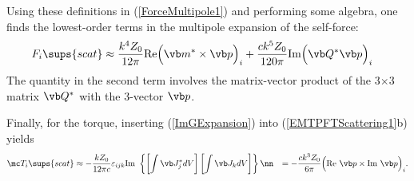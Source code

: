 Using these definitions in (\ref{ForceMultipole1}) and performing
some algebra, one finds the lowest-order terms in the multipole 
expansion of the self-force:
\begin{align}
  F_i\sups{scat}
\label{ForceMultipole1}
&\approx
\frac{k^4 Z_0}{12\pi}\text{Re}\Big( \vb m^* \times \vb p \Big)_i
+
\frac{c k^5 Z_0}{120\pi}\text{Im}\Big( \vb Q^* \vb p \Big)_i
\end{align}
The quantity in the second term involves the matrix-vector product 
of the 3$\times $3 matrix $\vb Q^*$ with the 3-vector $\vb p$.

Finally, for the torque, inserting (\ref{ImGExpansion}) into
(\ref{EMTPFTScattering1}b) yields
\begin{align}
  \mc T_i\sups{scat}
&\approx
-\frac{k Z_0}{12 \pi c}\varepsilon_{ijk}
  \text{Im }\left\{ 
\left[\int \vb J^*_j dV\right] \left[\int \vb J_k dV\right]
            \right\}
\nn
&= -\frac{c k^3 Z_0}{6 \pi}
    \Big(\text{Re }\vb p \times \text{Im }\vb p\Big)_i.
\label{TorqueMultipole}
\end{align}


